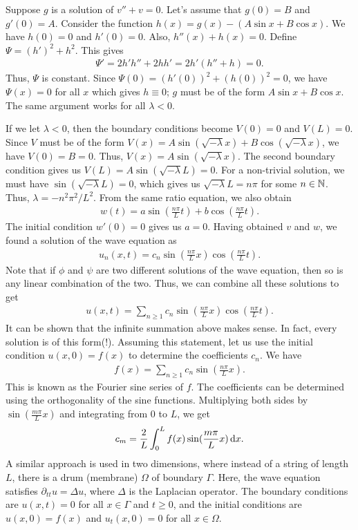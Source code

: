 Suppose $g$ is a solution of $v'' + v = 0$. Let's assume that $g(0) = B$ and $g'(0) = A$. Consider the function $h(x) = g(x) - (A \sin x + B \cos x)$. We have $h(0) = 0$ and $h'(0) = 0$. Also, $h''(x) + h(x) = 0$. Define $\Psi = (h')^{2} + h^{2}$. This gives
\begin{align}
    \Psi' = 2 h' h'' + 2 h h'= 2 h' (h'' + h) = 0.
\end{align}
Thus, $\Psi$ is constant. Since $\Psi(0) = (h'(0))^{2} + (h(0))^{2} = 0$, we have $\Psi(x) = 0$ for all $x$ which gives $h \equiv 0$; $g$ must be of the form $A \sin x + B \cos x$. The same argument works for all $\lambda < 0$.

If we let $\lambda < 0$, then the boundary conditions become $V(0) = 0$ and $V(L) = 0$. Since $V$ must be of the form $V(x) = A \sin (\sqrt{-\lambda} x) + B \cos (\sqrt{-\lambda} x)$, we have $V(0) = B = 0$. Thus, $V(x) = A \sin (\sqrt{-\lambda} x)$. The second boundary condition gives us $V(L) = A \sin (\sqrt{-\lambda} L) = 0$. For a non-trivial solution, we must have $\sin (\sqrt{-\lambda} L) = 0$, which gives us $\sqrt{-\lambda} L = n \pi$ for some $n \in \mathbb{N}$. Thus, $\lambda = - n^{2} \pi^{2} / L^{2}$. From the same ratio equation, we also obtain
\begin{align}
    w(t) = a \sin ( \frac{n\pi}{L} t) + b \cos ( \frac{n \pi}{L} t).
\end{align}
The initial condition $w'(0) = 0$ gives us $a = 0$. Having obtained $v$ and $w$, we found a solution of the wave equation as
\begin{align}
    u_{n}(x,t) = c_{n} \sin ( \frac{n \pi}{L} x) \cos ( \frac{n \pi}{L} t).
\end{align}
Note that if $\phi$ and $\psi$ are two different solutions of the wave equation, then so is any linear combination of the two. Thus, we can combine all these solutions to get
\begin{align}
    u(x,t) = \sum_{n \geq 1} c_{n} \sin ( \frac{n \pi}{L} x) \cos ( \frac{n \pi}{L} t).
\end{align}
It can be shown that the infinite summation above makes sense. In fact, every solution is of this form(!). Assuming this statement, let us use the initial condition $u(x,0) = f(x)$ to determine the coefficients $c_{n}$. We have
\begin{align}
    f(x) = \sum_{n \geq 1} c_{n} \sin ( \frac{n \pi}{L} x).
\end{align}
This is known as the Fourier sine series of $f$. The coefficients can be determined using the orthogonality of the sine functions. Multiplying both sides by $\sin ( \frac{m \pi}{L} x)$ and integrating from $0$ to $L$, we get
\begin{align}
    c_{m} = \frac{2}{L} \int_{0}^{L} f(x) \sin (\frac{m \pi}{L} x) \, \mathrm{d}x.
\end{align}
A similar approach is used in two dimensions, where instead of a string of length $L$, there is a drum (membrane) $\Omega$ of boundary $\Gamma$. Here, the wave equation satisfies $\partial_{tt} u = \Delta u$, where $\Delta$ is the Laplacian operator. The boundary conditions are $u(x,t) = 0$ for all $x \in \Gamma$ and $t \geq 0$, and the initial conditions are $u(x,0) = f(x)$ and $u_{t}(x,0) = 0$ for all $x \in \Omega$. 

